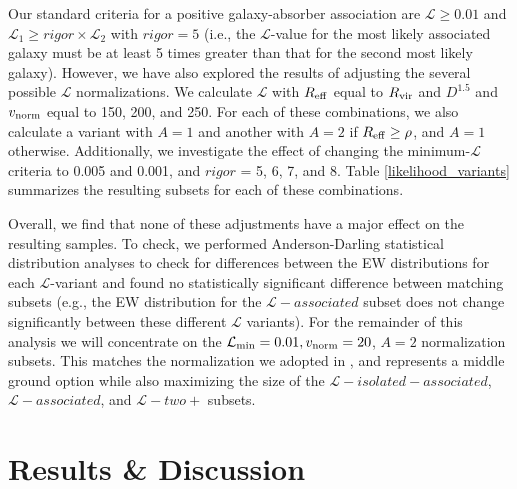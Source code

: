 \documentclass[twocolumn,tighten]{aastex62}
\begin{document}
Our standard criteria for a positive galaxy-absorber association are $\mathcal{L} \geq 0.01$ and $\mathcal{L}_1 \geq rigor \times \mathcal{L}_2$ with $rigor =5$ (i.e., the $\mathcal{L}$-value for the most likely associated galaxy must be at least 5 times greater than that for the second most likely galaxy). However, we have also explored the results of adjusting the several possible $\mathcal{L}$ normalizations. We calculate $\mathcal{L}$ with $R_{\rm eff}$ equal to $R_{\rm vir}$ and $D^{1.5}$ and $v_{\rm norm}$ equal to 150, 200, and 250. For each of these combinations, we also calculate a variant with $A =1$ and another with $A = 2$ if $R_{\rm eff} \ge \rho$, and $A=1$ otherwise. Additionally, we investigate the effect of changing the minimum-$\mathcal{L}$ criteria to 0.005 and 0.001, and $rigor$ = 5, 6, 7, and 8. Table \ref{likelihood_variants} summarizes the resulting subsets for each of these combinations. 

Overall, we find that none of these adjustments have a major effect on the resulting samples. To check, we performed Anderson-Darling statistical distribution analyses to check for differences between the EW distributions for each $\mathcal{L}$-variant and found no statistically significant difference between matching subsets (e.g., the EW distribution for the $\mathcal{L}-associated$ subset does not change significantly between these different $\mathcal{L}$ variants). For the remainder of this analysis we will concentrate on the $\mathcal{L}_{\rm min} = 0.01, v_{\rm norm} = 20$, $A = 2$ normalization subsets. This matches the normalization we adopted in \cite{french2017}, and represents a middle ground option while also maximizing the size of the $\mathcal{L}-isolated-associated$, $\mathcal{L}-associated$, and $\mathcal{L}-two+$ subsets.





\section{Results \& Discussion}
\end{document}
